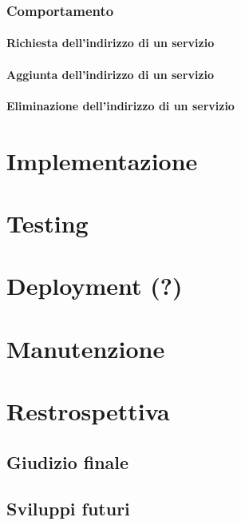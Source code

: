 \documentclass[a4paper,12pt]{report}
\begin{document}
\subsection{Comportamento}
\subsubsection{Richiesta dell'indirizzo di un servizio}
\subsubsection{Aggiunta dell'indirizzo di un servizio}
\subsubsection{Eliminazione dell'indirizzo di un servizio}


\chapter{Implementazione}

\chapter{Testing} 

\chapter{Deployment (?)}

\chapter{Manutenzione}

\chapter{Restrospettiva}
\section{Giudizio finale}
\section{Sviluppi futuri}

 
\end{document}
